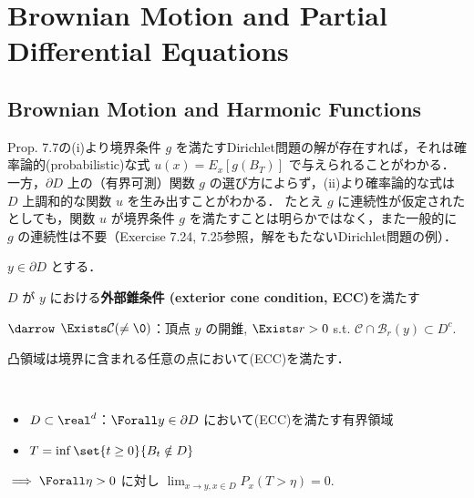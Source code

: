\documentclass{jsarticle}
\title{}
\author{}
\date{
}
\begin{document}
\setcounter{section}{6}
\section{Brownian Motion and Partial Differential Equations}
\setcounter{subsection}{1}
\subsection{Brownian Motion and Harmonic Functions}

Prop. 7.7の(i)より境界条件 $g$ を満たすDirichlet問題の解が存在すれば，それは確率論的(probabilistic)な式 $u(x)=E_x[g(B_T)]$ で与えられることがわかる．
一方，$\partial D$ 上の（有界可測）関数 $g$ の選び方によらず，(ii)より確率論的な式は $D$ 上調和的な関数 $u$ を生み出すことがわかる．
たとえ $g$ に連続性が仮定されたとしても，関数 $u$ が境界条件 $g$ を満たすことは明らかではなく，また一般的に $g$ の連続性は不要（Exercise 7.24, 7.25参照，解をもたないDirichlet問題の例）．

\begin{shadebox}
    \begin{df*}
        $y\in\partial D$ とする．
        
        $D$ が $y$ における\textbf{外部錐条件 (exterior cone condition, ECC)}を満たす
        
        $\darrow$
        $\Exists \mathcal{C}(\neq\0)$：頂点 $y$ の開錐, $\Exists r>0$ s.t. $\mathcal{C}\cap \mathcal{B}_r(y)\subset D^c.$
    \end{df*}
\end{shadebox}

\begin{ex*}
    凸領域は境界に含まれる任意の点において(ECC)を満たす．
\end{ex*}


\setcounter{thm}{8}
\begin{shadebox}
    \begin{lem}\label{thm:709}~
        \begin{itemize}
            \item $D\subset \real^d$：$\Forall y\in\partial D$ において(ECC)を満たす有界領域
            \item $T=\inf\set{t\ge0}{B_t\notin D}$
        \end{itemize}
    
        $\implies \Forall \eta>0$ に対し $\lim_{x\to y, x\in D}P_x(T>\eta) = 0.$
    \end{lem}
\end{shadebox}
\end{document}

